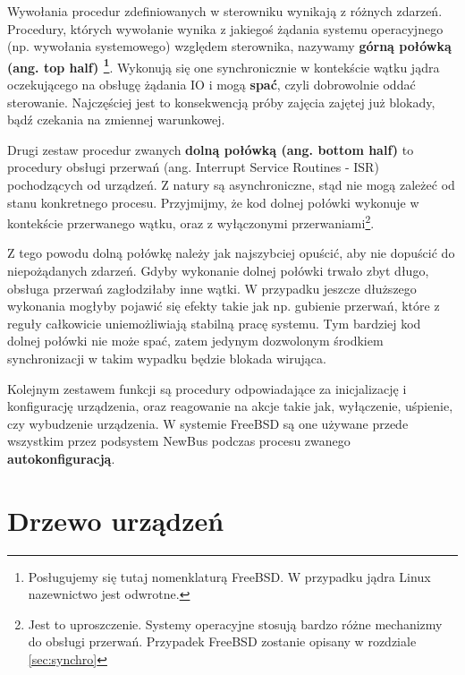 \documentclass[shortabstract,inz]{iithesis}
\begin{document}

Wywołania procedur zdefiniowanych w sterowniku wynikają z różnych zdarzeń.
Procedury, których wywołanie wynika z jakiegoś żądania systemu operacyjnego 
(np. wywołania systemowego) względem sterownika, nazywamy
\textbf{górną połówką (ang. top half) \footnote{Posługujemy się tutaj nomenklaturą FreeBSD.
W przypadku jądra Linux nazewnictwo jest odwrotne.}}.
Wykonują się one synchronicznie w kontekście wątku jądra oczekującego na obsługę żądania IO i mogą
\textbf{spać}, czyli dobrowolnie oddać sterowanie.
Najczęściej jest to konsekwencją próby zajęcia zajętej już blokady, bądź czekania
na zmiennej warunkowej.

Drugi zestaw procedur zwanych \textbf{dolną połówką (ang. bottom half)} to procedury
obsługi przerwań (ang. Interrupt Service Routines - ISR) pochodzących od urządzeń.
Z natury są asynchroniczne, stąd nie mogą zależeć od stanu konkretnego procesu. 
Przyjmijmy, że kod dolnej połówki wykonuje w kontekście przerwanego wątku, oraz
z wyłączonymi przerwaniami\footnote{Jest to uproszczenie. Systemy operacyjne stosują
bardzo różne mechanizmy do obsługi przerwań. Przypadek FreeBSD zostanie opisany
w rozdziale \ref{sec:synchro}}.

Z tego powodu dolną połówkę należy jak najszybciej opuścić, aby nie dopuścić
do niepożądanych zdarzeń. Gdyby wykonanie dolnej połówki trwało zbyt długo,
obsługa przerwań zagłodziłaby inne wątki.
W przypadku jeszcze dłuższego wykonania
mogłyby pojawić się efekty takie jak np. gubienie przerwań, które
z reguły całkowicie uniemożliwiają stabilną pracę systemu.
Tym bardziej kod dolnej połówki nie może spać, zatem jedynym
dozwolonym środkiem synchronizacji w takim wypadku będzie blokada wirująca.

Kolejnym zestawem funkcji są procedury odpowiadające za inicjalizację i konfigurację 
urządzenia, oraz reagowanie na akcje takie jak, wyłączenie, uśpienie, czy wybudzenie urządzenia.
W systemie FreeBSD są one używane przede wszystkim przez podsystem NewBus podczas 
procesu zwanego \textbf{autokonfiguracją}.

\section{Drzewo urządzeń} %
\end{document}
